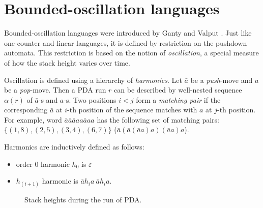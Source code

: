 \section{Bounded-oscillation languages}
\label{sec:osc}
Bounded-oscillation languages were introduced by Ganty and Valput \cite{BoundOsc}. Just like one-counter and linear languages, it is defined by restriction on the pushdown automata. This restriction is based on the notion of \textit{oscillation}, a special measure of how the stack height varies over time. 


Oscillation is defined using a hierarchy of \textit{harmonics}. Let $\bar{a}$ be a \textit{push}-move and $a$ be a \textit{pop}-move. Then a PDA run $r$ can be described by well-nested sequence $\alpha(r)$ of $\bar{a}$-s and $a$-s. Two positions $i<j$ form a \textit{matching pair} if the corresponding $\bar{a}$ at $i$-th position of the sequence matches with $a$ at $j$-th position. For example, word $\bar{a}\bar{a}\bar{a}aa\bar{a}aa$ has the following set of matching pairs: $\{(1, 8), (2, 5), (3, 4), (6, 7)\}$ ($\bar{a}(\bar{a}(\bar{a}a)a)(\bar{a}a)a$).


Harmonics are inductively defined as follows:
\begin{itemize}
\item  order 0 harmonic $h_0$ is $\varepsilon$
\item  $h_{(i+1)}$ harmonic is $\bar{a}h_ia\ \bar{a}h_ia$.
\end{itemize}
\begin{figure}
\centering
{}
\caption{Stack heights during the run of PDA.}
\label{oscb}
\end{figure}



